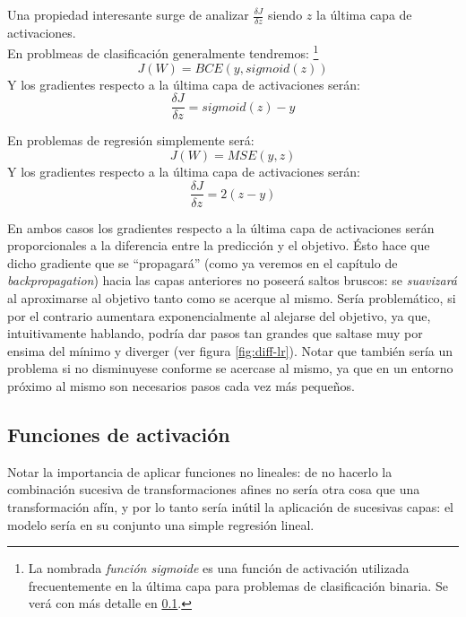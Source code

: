 Una propiedad interesante surge de analizar $ \frac{\delta J}{\delta z} $ siendo $z$ la última capa de activaciones.\\

En problmeas de clasificación generalmente tendremos: \footnote{La nombrada \textit{función sigmoide} es una función de activación utilizada frecuentemente en la última capa para problemas de clasificación binaria. Se verá con más detalle en \ref{subsection:activaciones}. }
\begin{equation*}
    J(W) = BCE(y, sigmoid(z))
\end{equation*}
Y los gradientes respecto a la última capa de activaciones serán:
\begin{equation*}
    \frac{\delta J}{\delta z} = sigmoid(z) - y
\end{equation*}

En problemas de regresión simplemente será:
\begin{equation*}
    J(W) = MSE(y, z)
\end{equation*}
Y los gradientes respecto a la última capa de activaciones serán:
\begin{equation*}
    \frac{\delta J}{\delta z} = 2 (z - y)
\end{equation*}

En ambos casos los gradientes respecto a la última capa de activaciones serán proporcionales a la diferencia entre la predicción y el objetivo. 
Ésto hace que dicho gradiente que se ``propagará'' (como ya veremos en el capítulo de \textit{backpropagation}) hacia las capas anteriores no poseerá saltos bruscos: se \textit{suavizará} al aproximarse al objetivo tanto como se acerque al mismo. Sería problemático, si por el contrario aumentara exponencialmente al alejarse del objetivo, ya que, intuitivamente hablando, podría dar pasos tan grandes que saltase muy por ensima del mínimo y diverger (ver figura \ref{fig:diff-lr}). Notar que también sería un problema si no disminuyese conforme se acercase al mismo, ya que en un entorno próximo al mismo son necesarios pasos cada vez más pequeños.

\subsection{Funciones de activación} \label{subsection:activaciones}

Notar la importancia de aplicar funciones no lineales: de no hacerlo la combinación sucesiva de transformaciones afines no sería otra cosa que una transformación afín, y por lo tanto sería inútil la aplicación de sucesivas capas: el modelo sería en su conjunto una simple regresión lineal.

